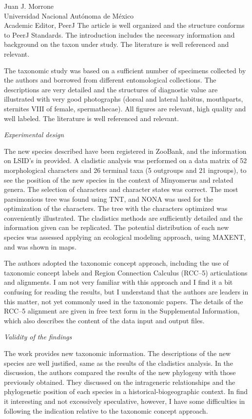 \documentclass[10pt,letterpaper]{letter}
\begin{document}
\begin{letter}{Juan J. Morrone\\Universidad Nacional Aut\'{o}noma de M\'{e}xico\\Academic Editor, PeerJ}
	The article is well organized and the structure conforms to PeerJ Standards. 
	The introduction includes the necessary information and background on the taxon under study. The literature is well referenced and relevant. 

	The taxonomic study was based on a sufficient number of specimens collected by the authors and borrowed from different entomological collections. 
	The descriptions are very detailed and the structures of diagnostic value are illustrated with very good photographs (dorsal and lateral habitus, mouthparts, sternites VIII of female, spermathecae). 
	All figures are relevant, high quality and well labeled. The literature is well referenced and relevant.

	\emph{Experimental design}
	
	The new species described have been registered in ZooBank, and the information on LSID’s in provided. 
	A cladistic analysis was performed on a data matrix of 52 morphological characters and 26 terminal taxa (5 outgroups and 21 ingroups), to see the position of the new species in the context of Minyomerus and related genera. The selection of characters and character states was correct. 
	The most parsimonious tree was found using TNT, and NONA was used for the optimization of the characters. 
	The tree with the characters optimized was conveniently illustrated. 
	The cladistics methods are sufficiently detailed and the information given can be replicated.
	The potential distribution of each new species was assessed applying an ecological modeling approach, using MAXENT, and was shown in maps. 

	The authors adopted the taxonomic concept approach, including the use of taxonomic concept labels and Region Connection Calculus (RCC–5) articulations and alignments.
	I am not very familiar with this approach and I find it a bit confusing for reading the results, but I understand that the authors are leaders in this matter, not yet commonly used in the taxonomic papers.
	The details of the RCC–5 alignment are given in free text form in the Supplemental Information, which also describes the content of the data input and output files.

	\newpage
	\emph{Validity of the findings}
	
	The work provides new taxonomic information.
	The descriptions of the new species are well justified, same as the results of the cladistics analysis.
	In the discussion, the authors compared the results of the new phylogeny with those previously obtained.
	They discussed on the intrageneric relationships and the phylogenetic position of each species in a historical-biogeographic context.
	In find it interesting and not excessively speculative, however, I have some difficulties in following the indication relative to the taxonomic concept approach.
	

\end{letter}
\end{document}

